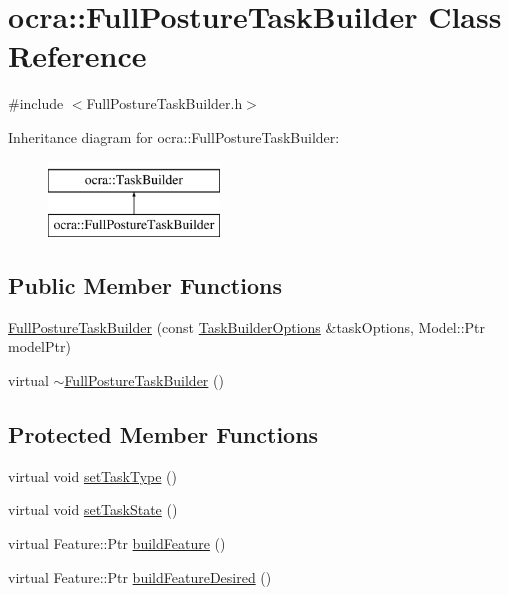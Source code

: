 \hypertarget{classocra_1_1FullPostureTaskBuilder}{}\section{ocra\+:\+:Full\+Posture\+Task\+Builder Class Reference}
\label{classocra_1_1FullPostureTaskBuilder}


{\ttfamily \#include $<$Full\+Posture\+Task\+Builder.\+h$>$}

Inheritance diagram for ocra\+:\+:Full\+Posture\+Task\+Builder\+:\begin{figure}[H]
\begin{center}
\leavevmode
\includegraphics[height=2.000000cm]{d7/d9e/classocra_1_1FullPostureTaskBuilder}
\end{center}
\end{figure}
\subsection*{Public Member Functions}
\begin{DoxyCompactItemize}
\item 
\hyperlink{classocra_1_1FullPostureTaskBuilder_a0b26fe3e55fe1c9881844d34651decea}{Full\+Posture\+Task\+Builder} (const \hyperlink{classocra_1_1TaskBuilderOptions}{Task\+Builder\+Options} \&task\+Options, Model\+::\+Ptr model\+Ptr)
\item 
virtual \hyperlink{classocra_1_1FullPostureTaskBuilder_a4829af35d08e67294aad90e19c70c916}{$\sim$\+Full\+Posture\+Task\+Builder} ()
\end{DoxyCompactItemize}
\subsection*{Protected Member Functions}
\begin{DoxyCompactItemize}
\item 
virtual void \hyperlink{classocra_1_1FullPostureTaskBuilder_a5bae08175fd730b46004ddfccc9a1d8b}{set\+Task\+Type} ()
\item 
virtual void \hyperlink{classocra_1_1FullPostureTaskBuilder_a0f3852057b316baa402806fb320d257b}{set\+Task\+State} ()
\item 
virtual Feature\+::\+Ptr \hyperlink{classocra_1_1FullPostureTaskBuilder_a7651ca4fd2ef7c8096a399b128981122}{build\+Feature} ()
\item 
virtual Feature\+::\+Ptr \hyperlink{classocra_1_1FullPostureTaskBuilder_ac9ea83ee3f872995c6dc214e91fc28a0}{build\+Feature\+Desired} ()
\end{DoxyCompactItemize}
